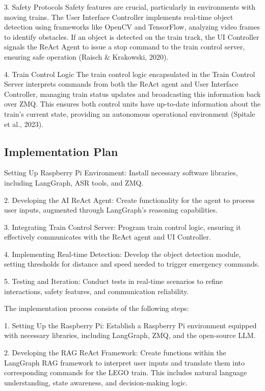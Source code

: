 3. Safety Protocols
Safety features are crucial, particularly in environments with moving trains. The User Interface Controller implements real-time object detection using frameworks like OpenCV and TensorFlow, analyzing video frames to identify obstacles. If an object is detected on the train track, the UI Controller signals the ReAct Agent to issue a stop command to the train control server, ensuring safe operation (Raisch & Krakowski, 2020).

4. Train Control Logic
The train control logic encapsulated in the Train Control Server interprets commands from both the ReAct agent and User Interface Controller, managing train status updates and broadcasting this information back over ZMQ. This ensures both control units have up-to-date information about the train's current state, providing an autonomous operational environment (Spitale et al., 2023).








\subsection{Implementation Plan}
Setting Up Raspberry Pi Environment: Install necessary software libraries, including LangGraph, ASR tools, and ZMQ.

2. Developing the AI ReAct Agent: Create functionality for the agent to process user inputs, augmented through LangGraph’s reasoning capabilities.

3. Integrating Train Control Server: Program train control logic, ensuring it effectively communicates with the ReAct agent and UI Controller.

4. Implementing Real-time Detection: Develop the object detection module, setting thresholds for distance and speed needed to trigger emergency commands.

5. Testing and Iteration: Conduct tests in real-time scenarios to refine interactions, safety features, and communication reliability.



The implementation process consists of the following steps:

1. Setting Up the Raspberry Pi: Establish a Raspberry Pi environment equipped with necessary libraries, including LangGraph, %
ZMQ, and the open-source LLM.

2. Developing the RAG ReAct Framework: Create functions within the LangGraph RAG framework to interpret user inputs and translate them into corresponding commands for the LEGO train. This includes natural language understanding, state awareness, and decision-making logic.

